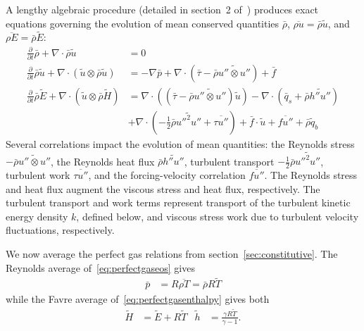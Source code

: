 \documentclass[letterpaper,11pt,nointlimits,reqno]{amsart}
\begin{document}
A lengthy algebraic procedure (detailed in section~2
of~\cite{OliverFANSModels2011}) produces exact equations governing the
evolution of mean conserved quantities $\bar{\rho}$, $\overline{\rho{}u}=
\bar{\rho}\tilde{u}$, and $\overline{\rho{}E} = \bar{\rho}\tilde{E}$:
\begin{subequations}\label{eq:unclosedfansequations}
\begin{align}
  \frac{\partial}{\partial{}t}\bar{\rho}+\nabla\cdot\bar{\rho}\tilde{u} &= 0
\\
    \frac{\partial{}}{\partial{}t}\bar{\rho}\tilde{u}
  + \nabla\cdot(\tilde{u}\otimes\bar{\rho}\tilde{u})
&=
  - \nabla{}\bar{p}
  + \nabla\cdot\left(
        \bar{\tau}
      - \bar{\rho}\widetilde{u''\otimes{}u''}
    \right)
  + \bar{f}
\\
  \frac{\partial}{\partial{}t} \bar{\rho}\tilde{E}
  +
  \nabla\cdot{}(\tilde{u}\otimes\bar{\rho}\tilde{H})
&=
    \nabla\cdot\left(
        \left(\bar{\tau}
      - \bar{\rho} \widetilde{u''\otimes{}u''}\right)
    \tilde{u}\right)
  - \nabla\cdot\left(
        \bar{q}_s
      + \bar{\rho} \widetilde{h''u''}
    \right)
\\
 &+ \nabla\cdot\left(
        -\frac{1}{2}\bar{\rho}\widetilde{{u''}^{2}u''}
      + \overline{\tau{}u''}
    \right)
  + \bar{f}\cdot\tilde{u}
  + \overline{fu''}
  + \bar{\rho}\tilde{q}_b
\end{align}
\end{subequations}
Several correlations impact the evolution of mean quantities: the Reynolds
stress $-\bar{\rho}\widetilde{u''\otimes{}u''}$, the Reynolds heat flux
$\bar{\rho} \widetilde{h''u''}$, turbulent transport
$-\frac{1}{2}\bar{\rho}\widetilde{{u''}^{2}u''}$, turbulent work
$\overline{\tau{}u''}$, and the forcing-velocity correlation $\overline{fu''}$.
The Reynolds stress and heat flux augment the viscous stress and heat flux,
respectively.  The turbulent transport and work terms represent transport of
the turbulent kinetic energy density $k$, defined below, and viscous stress
work due to turbulent velocity fluctuations, respectively.

We now average the perfect gas relations from section~\ref{sec:constitutive}.
The Reynolds average of~\eqref{eq:perfectgaseos} gives
\begin{align}
  \bar{p} &= R\overline{\rho{}T} = \bar{\rho}R\tilde{T}
\end{align}
while the Favre average of~\eqref{eq:perfectgasenthalpy} gives both
\begin{align}
 \tilde{H} &= \tilde{E} + R \tilde{T}
&
 \tilde{h} &= \frac{\gamma{}R\tilde{T}}{\gamma-1}.
\end{align}
\end{document}
